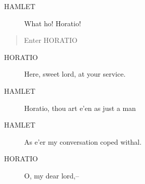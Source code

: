 \documentclass{article}
\begin{document}
\begin{description}
            
\item[HAMLET] What ho! Horatio!
\end{description}
          
\begin{quote}
Enter HORATIO
\end{quote}
          
\begin{description}
            
\item[HORATIO] Here, sweet lord, at your service.
\end{description}
          
\begin{description}
            
\item[HAMLET] Horatio, thou art e'en as just a man
\item[HAMLET] As e'er my conversation coped withal.
\end{description}
          
\begin{description}
            
\item[HORATIO] O, my dear lord,--
\end{description}
          
\end{document}

